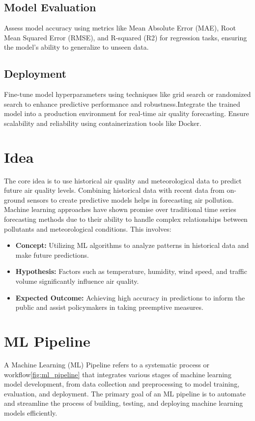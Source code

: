 \subsection {Model Evaluation}
Assess model accuracy using metrics like Mean Absolute Error (MAE), Root Mean Squared Error (RMSE), and R-squared (R2) for regression tasks, ensuring the model's ability to generalize to unseen data\cite{GeeksforGeeks:2024}.
\subsection {Deployment}
Fine-tune model hyperparameters using techniques like grid search or randomized search to enhance predictive performance and robustness.Integrate the trained model into a production environment for real-time air quality forecasting. Ensure scalability and reliability using containerization tools like Docker\cite{GeeksforGeeks:2024}.
\section{Idea}
The core idea is to use historical air quality and meteorological data to predict future air quality levels. Combining historical data with recent data from on-ground sensors to create predictive models helps in forecasting air pollution. Machine learning approaches have shown promise over traditional time series forecasting methods due to their ability to handle complex relationships between pollutants and meteorological conditions. This involves:

\begin{itemize}
	\item \textbf{Concept:} Utilizing ML algorithms to analyze patterns in historical data and make future predictions.
    \item \textbf{Hypothesis:} Factors such as temperature, humidity, wind speed, and traffic volume significantly influence air quality.
    \item \textbf{Expected Outcome:} Achieving high accuracy in predictions to inform the public and assist policymakers in taking preemptive measures.
\end{itemize}





\section{ML Pipeline}
	A Machine Learning (ML) Pipeline refers to a systematic process or workflow\ref{fig:ml_pipeline} that integrates various stages of machine learning model development, from data collection and preprocessing to model training, evaluation, and deployment. The primary goal of an ML pipeline is to automate and streamline the process of building, testing, and deploying machine learning models efficiently.\cite{Ravindiran:2023}


